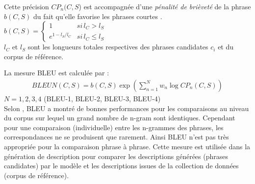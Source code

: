 Cette précision $CP_{n}(C,S$) est accompagnée d'une \textit{pénalité de brièveté} de la phrase $b(C,S)$ du fait qu'elle favorise les phrases courtes \cite{papineni2002bleu}.\\
$
b(C,S)=\left\{\begin{matrix}
1 & si \, l_{C}>l_{S}\\ 
e^{1-l_{S}/l_{C}} & si \, l_{C}\leq l_{S}
\end{matrix}\right.
$
\\
$l_{C}$ et $l_{S}$ sont les longueurs totales respectives des phrases candidates $c_i$ et du corpus de référence.

La mesure BLEU est calculée par :
\begin{eqnarray}
BLEU{N}(C,S)=b(C,S) \exp \left (  \sum_{n=1}^{N} w_{n} \log CP_{n}(C,S)  \right )
\end{eqnarray}
$N = 1, 2, 3, 4$ (BLEU-1, BLEU-2, BLEU-3, BLEU-4)
\\
\qquad	Selon \cite{chen2015microsoft}, BLEU a montré de bonnes performances pour les comparaisons au niveau du corpus sur lequel un grand nombre de  n-gram sont identiques. Cependant pour une comparaison (individuelle) entre les n-grammes des phrases, les correspondances ne se produisent que rarement. Ainsi BLEU n'est pas très appropriée pour la comparaison phrase à phrase.
	Cette mesure est utilisée dans la génération de description pour comparer les descriptions générées (phrases candidates) par le modèle et les descriptions issues de la collection de données (corpus de référence).

%
%

